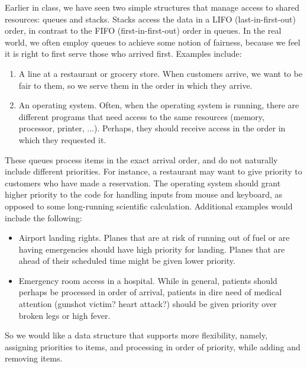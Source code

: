 Earlier in class, we have seen two simple structures that manage access
to shared resources: queues and stacks. Stacks access the data in a
LIFO (last-in-first-out) order, in contrast to the FIFO
(first-in-first-out) order in queues. 
In the real world, we often employ queues to achieve some notion of
fairness, because we feel it is right to first serve those who arrived
first. Examples include:
\begin{enumerate}
\item A line at a restaurant or grocery store. 
  When customers arrive, we want to be
  fair to them, so we serve them in the order in which they arrive. 
\item An operating system. Often, when the operating system is
running, there are different programs that need access to the same
resources (memory, processor, printer, $\ldots$). Perhaps, they should
receive access in the order in which they requested it.
\end{enumerate}

These queues process items in the exact arrival order, and do not
naturally include different priorities.
For instance, a restaurant may want to give priority to customers who
have made a reservation.
The operating system should grant higher priority to the code for
handling inputs from mouse and keyboard, as opposed to some
long-running scientific calculation.
Additional examples would include the following:
\begin{itemize}
\item Airport landing rights. Planes that are at risk of running out
  of fuel or are having emergencies should have high priority for
  landing. Planes that are ahead of their scheduled time might be
  given lower priority.
\item Emergency room access in a hospital. While in general, patients
  should perhaps be processed in order of arrival, patients in dire
  need of medical attention (gunshot victim? heart attack?) should be
  given priority over broken legs or high fever.
\end{itemize}

So we would like a data structure that supports more flexibility,
namely, assigning priorities to items, and processing in order of
priority, while adding and removing items.

